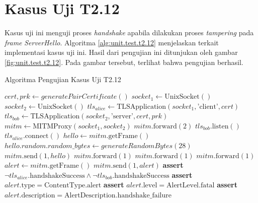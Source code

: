 \section{Kasus Uji T2.12}

Kasus uji ini menguji proses \emph{handshake} apabila dilakukan proses \emph{tampering} pada \emph{frame} \emph{ServerHello}. Algoritma \ref{alg:unit.test.t2.12} menjelaskan terkait implementasi kasus uji ini. Hasil dari pengujian ini ditunjukan oleh gambar \ref{fig:unit.test.t2.12}. Pada gambar tersebut, terlihat bahwa pengujian berhasil.


\begin{algorithm}
  \caption{Algoritma Pengujian Kasus Uji T2.12}
  \label{alg:unit.test.t2.12}
  \begin{algorithmic}
    \State $cert, prk \gets generatePairCertificate()$
    \State $socket_1 \gets \text{UnixSocket}()$
    \State $socket_2 \gets \text{UnixSocket}()$
    \State $tls_{alice} \gets \text{TLSApplication}(socket_1, \text{'client'}, cert)$ 
    \State $tls_{bob} \gets \text{TLSApplication}(socket_2, \text{'server'}, cert, prk)$
    \State $mitm \gets \text{MITMProxy}(socket_1, socket_2)$
    \State
    \State $mitm.\text{forward}(2)$ 
    \State $tls_{bob}.\text{listen}()$  
    \State $tls_{alice}.\text{connect}()$  
    \State
    \State $hello \gets mitm.\text{getFrame}()$ 
    \State $hello.random.random\_bytes \gets generateRandomBytes(28)$
    \State $mitm.\text{send}(1, hello)$
    \State $mitm.\text{forward}(1)$ 
    \State $mitm.\text{forward}(1)$ 
    \State $mitm.\text{forward}(1)$ 
    \State
    \State $alert \gets mitm.\text{getFrame}()$
    \State $mitm.\text{send}(1, alert)$
    \State
    \State \textbf{assert} $\lnot tls_{alice}.\text{handshakeSuccess} \land \lnot tls_{bob}.\text{handshakeSuccess}$
    \State \textbf{assert} $alert.\text{type} = \text{ContentType.alert}$
    \State \textbf{assert} $alert.\text{level} = \text{AlertLevel.fatal}$
    \State \textbf{assert} $alert.\text{description} = \text{AlertDescription.handshake\_failure}$
  \end{algorithmic}
\end{algorithm}

